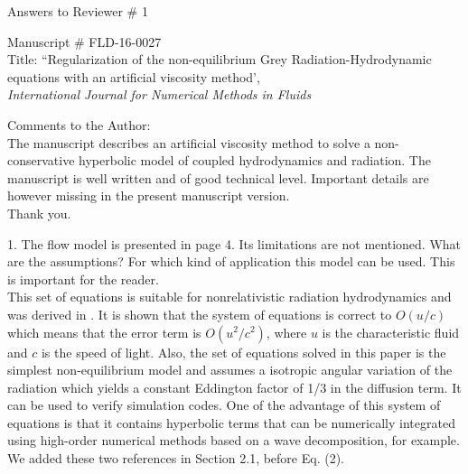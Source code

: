 \documentclass{article}
\begin{document}
\begin{center}
{ \Large Answers to Reviewer \# 1}
\end{center}

\bigskip

\noindent Manuscript \# FLD-16-0027 \\
Title: ``Regularization of the non-equilibrium Grey Radiation-Hydrodynamic equations with an artificial viscosity method', \\
{\it International Journal for Numerical Methods in Fluids}\\

\bigskip
\bigskip

{\color{blue}
Comments to the Author: \\ 
The manuscript describes an artificial viscosity method to solve a non-conservative hyperbolic model of coupled hydrodynamics and radiation. The manuscript is well written and of good technical level.
Important details are however missing in the present manuscript version.\\}
Thank you.
\bigskip

{\color{blue}
1. The flow model is presented in page 4. Its limitations are not mentioned. What are the assumptions? For which kind of application this model can be used. This is important for the reader. \\}
This set of equations is suitable for nonrelativistic radiation hydrodynamics and was derived in \cite{LowrieMorelHittinger, LowrieMorel}. It is shown that the system of equations is correct to $O(u/c)$ which means that the error term is $O(u^2/c^2)$, where $u$ is the characteristic fluid and $c$ is the speed of light. Also, the set of equations solved in this paper is the simplest non-equilibrium model and assumes a isotropic angular variation of the radiation which yields a constant Eddington factor of 1/3 in the diffusion term. It can be used to verify simulation codes. One of the advantage of this system of equations is that it contains hyperbolic terms that can be numerically integrated using high-order numerical methods based on a wave decomposition, for example. We added these two references in Section 2.1, before Eq. (2). 
\bigskip
\end{document}

